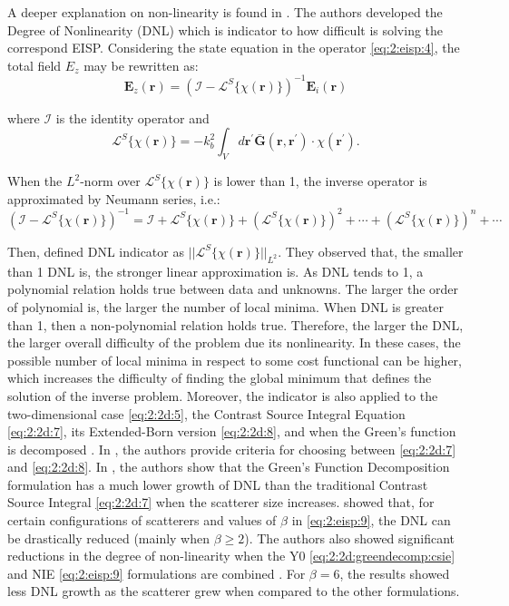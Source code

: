 			A deeper explanation on non-linearity is found in \cite{bucci2001degree}. The authors developed the Degree of Nonlinearity (DNL) which is indicator to how difficult is solving the correspond EISP. Considering the state equation in the operator \eqref{eq:2:eisp:4}, the total field $E_z$ may be rewritten as:
			\begin{equation}
				\mathbf{E}_z(\mathbf{r}) = \left(\mathcal{I} - \mathcal{L}^S\{\chi(\mathbf{r})\}\right)^{-1} \mathbf{E}_i(\mathbf{r})
			\end{equation}
		
			\noindent where $\mathcal{I}$ is the identity operator and $$\mathcal{L}^S\{\chi(\mathbf{r})\} = - k_b^2\int_V d\mathbf{r^\prime} \mathbf{\bar{G}}(\mathbf{r},\mathbf{r^\prime})\cdot\chi(\mathbf{r^\prime}).$$
			
			When the $L^2$-norm over $ \mathcal{L}^S\{\chi(\mathbf{r})\}$ is lower than 1, the inverse operator is approximated by Neumann series, i.e.:
			\begin{equation}
				\left(\mathcal{I} - \mathcal{L}^S\{\chi(\mathbf{r})\}\right)^{-1} = \mathcal{I} + \mathcal{L}^S\{\chi(\mathbf{r})\} + \left(\mathcal{L}^S\{\chi(\mathbf{r})\}\right)^2 + \cdots + \left(\mathcal{L}^S\{\chi(\mathbf{r})\}\right)^n + \cdots
			\end{equation}
			
			Then, \cite{bucci2001degree} defined DNL indicator as $||\mathcal{L}^S\{\chi(\mathbf{r})\}||_{L^2}$. They observed that, the smaller than 1 DNL is, the stronger linear approximation is. As DNL tends to 1, a polynomial relation holds true between data and unknowns. The larger the order of polynomial is, the larger the number of local minima. When DNL is greater than 1, then a non-polynomial relation holds true. Therefore, the larger the DNL, the larger overall difficulty of the problem due its nonlinearity. In these cases, the possible number of local minima in respect to some cost functional can be higher, which increases the difficulty of finding the global minimum that defines the solution of the inverse problem. Moreover, the indicator is also applied to the two-dimensional case \eqref{eq:2:2d:5}, the Contrast Source Integral Equation \eqref{eq:2:2d:7}, its Extended-Born version \eqref{eq:2:2d:8}, and when the Green's function is decomposed \citep{durso2010solution,bevacqua2021effective}. In \cite{durso2010solution}, the authors provide criteria for choosing between \eqref{eq:2:2d:7} and \eqref{eq:2:2d:8}. In \cite{bevacqua2021effective}, the authors show that the Green's Function Decomposition formulation has a much lower growth of DNL than the traditional Contrast Source Integral \eqref{eq:2:2d:7} when the scatterer size increases. \cite{bevacqua2021quantitative} showed that, for certain configurations of scatterers and values of $\beta$ in \eqref{eq:2:eisp:9}, the DNL can be drastically reduced (mainly when $\beta\ge2$). The authors also showed significant reductions in the degree of non-linearity when the Y0 \eqref{eq:2:2d:greendecomp:csie} and NIE \eqref{eq:2:eisp:9} formulations are combined \citep{bevacqua2021new}. For $\beta=6$, the results showed less DNL growth as the scatterer grew when compared to the other formulations.
			
